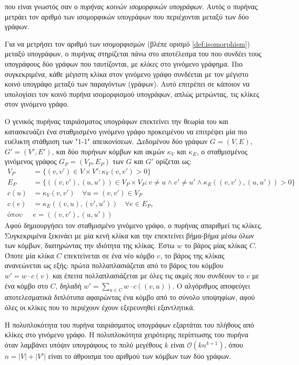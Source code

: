 που είναι γνωστός σαν ο \textit{πυρήνας κοινών ισομορφικών υπογράφων}.
Αυτός ο πυρήνας μετράει τον αριθμό των ισομορφικών υπογράφων που περιέχονται μεταξύ των δύο γράφων.\par
Για να μετρήσει τον αριθμό των ισομορφισμών (βλέπε ορισμό \ref{def:isomorphism}) μεταξύ υπογράφων, ο πυρήνας στηρίζεται πάνω στο αποτέλεσμα του  \cite{levi1973note} που συνδέει τους υπογράφους δύο γράφων που ταυτίζονται, με \textit{κλίκες} στο γινόμενο γράφημα.
Πιο συγκεκριμένα, κάθε μέγιστη κλίκα στον γινόμενο γράφο συνδέεται με τον μέγιστο κοινό υπογράφο μεταξύ των παραγόντων (γράφων).
Αυτό επιτρέπει σε κάποιον να υπολογίσει τον κοινό πυρήνα ισομορφισμού υπογράφων, απλώς μετρώντας, τις κλίκες στον γινόμενο γράφο.\par
Ο γενικός πυρήνας ταιριάσματος υπογράφων επεκτείνει την θεωρία του  και κατασκευάζει ένα σταθμισμένο γινόμενο γράφο προκειμένου να επιτρέψει μία πιο ευέλικτη στάθμιση των "1-1" απεικονίσεων.
Δεδομένου δύο γράφων $G=(V,E)$, $G'=(V',E')$, και δύο πυρήνων κόμβων και ακμών $\kappa_V$ και $\kappa_E$, ο σταθμισμένος γινόμενος γράφος $G_P=(V_P, E_P)$ των $G$ και $G'$ ορίζεται ως:
\begin{equation}
    \begin{split}
        V_P &= \{ (v,v') \in V \times V' : \kappa_V(v,v') > 0 \} \\
        E_P &= \{ ((v,v'),(u,u')) \in V_P \times V_P : v \neq u \wedge v' \neq u' \wedge \kappa_E((v,v'),(u,u')) > 0 \} \\
        c(u) &= \kappa_V(v,v') \quad \forall u=(v,v') \in V_P \\
        c(e) &= \kappa_E((v,u),(v',u')) \quad \forall e \in E_P, \\
        \text{όπου } &e=((v,v'),(u,u')) 
    \end{split}
\end{equation}
Αφού δημιουργήσει τον σταθμισμένο γινόμενο γράφο, ο πυρήνας απαριθμεί τις κλίκες.
Συγκεκριμένα ξεκινάει με μία κενή κλίκα και την επεκτείνει βήμα-βήμα μέσω όλων των κόμβων, διατηρώντας την ιδιότητα της κλίκας. 
Έστω $w$ το βάρος μίας κλίκας $C$.
Όποτε μία κλίκα $C$ επεκτείνεται σε ένα νέο κόμβο $v$, το βάρος της κλίκας ανανεώνεται ως εξής: πρώτα πολλαπλασιάζεται από το βάρος του κόμβου $w' = w \cdot c(v)$ και έπειτα πολλαπλασιάζεται με όλες τις ακμές που συνδέουν το $v$ με ένα κόμβο στο $C$, δηλαδή $w' = \sum_{u \in C} w \cdot c((v,u))$.
Ο αλγόριθμος αποφεύγει αποτελεσματικά διπλότυπα αφαιρώντας ένα κόμβο από το σύνολο υποψηφίων, αφού όλες οι κλίκες που το περιέχουν έχουν εξερευνηθεί εξαντλητικά.\par
Η πολυπλοκότητα του πυρήνα ταιριάσματος υπογράφων εξαρτάται του πλήθους από κλίκες στο γινόμενο γράφο.
Η πολυπλοκότητα χειρότερης περίπτωσης του πυρήνα όταν λαμβάνει υπόψιν υπογράφους το πολύ μεγέθους $k$ είναι $\mathcal{O}(kn^{k+1})$, όπου $n=|V|+|V'|$ είναι το άθροισμα του αριθμού των κόμβων των δύο γράφων.

